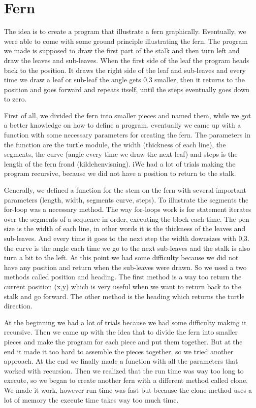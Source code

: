 \documentclass[titlepage]{article}
\begin{document}
\section{Fern}
The idea is to create a program that illustrate a fern graphically. Eventually, we were able to come with some ground principle illustrating the fern. The program we made is supposed to draw the first part of the stalk and then turn left and draw the leaves and sub-leaves. When the first side of the leaf the program heads back to the position. It draws the right side of the leaf and sub-leaves and every time we draw a leaf or sub-leaf the angle gets 0,3 smaller, then it returns to the position and goes forward and repeats itself, until the steps eventually goes down to zero.

First of all, we divided the fern into smaller pieces and named them, while we got a better knowledge on how to define a program. eventually we came up with a function with some necessary parameters for creating the fern. The parameters in the function are the turtle module, the width (thickness of each line), the segments, the curve (angle every time we draw the next leaf) and steps is the length of the fern frond (kildehenvisning). iWe had a lot of trials making the program recursive, because we did not have a position to return to the stalk.\par

Generally, we defined a function for the stem on the fern with several important parameters (length, width, segments curve, steps). To illustrate the segments the for-loop was a necessary method. The way for-loops work is for statement iterates over the segments of a sequence in order, executing the block each time. The pen size is the width of each line, in other words it is the thickness of the leaves and sub-leaves. And every time it goes to the next step the width downsizes with 0,3. the curve is the angle each time we go to the next sub-leaves and the stalk is also turn a bit to the left. At this point we had some difficulty because we did not have any position and return when the sub-leaves were drawn. So we used a two methods called position and heading. The first method is a way too return the current position (x,y) which is very useful when we want to return back to the stalk and go forward. The other method is the heading which returns the turtle direction.
\par
At the beginning we had a lot of trials because we had some difficulty making it recursive. Then we came up with the idea that to divide the fern into smaller pieces and make the program for each piece and put them together. But at the end it made it too hard to assemble the pieces together, so we tried another approach. At the end we finally made a function with all the parameters that worked with recursion. Then we realized that the run time was way too long to execute, so we began to create another fern with a different method called clone. We made it work, however run time was fast but because the clone method uses a lot of memory the execute time takes way too much time. 
\end{document}
